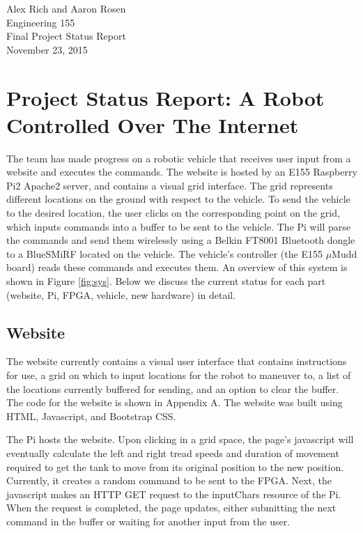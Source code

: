 \documentclass[11pt]{article}
\begin{document}
\thispagestyle{empty}
\begin{flushright}
Alex Rich and Aaron Rosen\\
Engineering 155 \\ 
Final Project Status Report\\
November 23, 2015
\end{flushright}
\section{Project Status Report: A Robot Controlled Over The Internet}

The team has made progress on a robotic vehicle that receives user input from a website and executes the commands. The website is hosted by an E155 Raspberry Pi2 Apache2 server, and contains a visual grid interface.  The grid represents different locations on the ground with respect to the vehicle.  To send the vehicle to the desired location, the user clicks on the corresponding point on the grid, which inputs commands into a buffer to be sent to the vehicle.  The Pi will parse the commands and send them wirelessly using a Belkin FT8001 Bluetooth dongle to a BlueSMiRF located on the vehicle.  The vehicle's controller (the E155 $\mu$Mudd board) reads these commands and executes them. An overview of this system is shown in Figure \ref{fig:sys}. Below we discuss the current status for each part (website, Pi, FPGA, vehicle, new hardware) in detail.

\subsection{Website}
The website currently contains a visual user interface that contains instructions for use, a grid on which to input locations for the robot to maneuver to, a list of the locations currently buffered for sending, and an option to clear the buffer. The code for the website is shown in Appendix A. The website was built using HTML, Javascript, and Bootstrap CSS. 

The Pi hosts the website. Upon clicking in a grid space, the page's javascript will eventually calculate the left and right tread speeds and duration of movement required to get the tank to move from its original position to the new position. Currently, it creates a random command to be sent to the FPGA. Next, the javascript makes an HTTP GET request to the inputChars resource of the Pi. When the request is completed, the page updates, either submitting the next command in the buffer or waiting for another input from the user.
\end{document}
